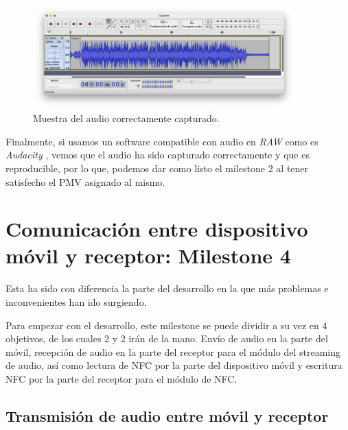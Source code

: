 \begin{figure}[h!]
    \centering
    \includegraphics[width=0.9\textwidth]{fotos/muestra_captura_audacity.png}
    \caption{Muestra del audio correctamente capturado.}
\end{figure}

Finalmente, si usamos un software compatible con audio en \emph{RAW} como es
\emph{Audacity} \cite{software-audacity}, vemos que el audio ha sido capturado
correctamente y que es reproducible, por lo que, podemos dar como listo el
milestone 2 al tener satisfecho el PMV asignado al mismo.

\section{Comunicación entre dispositivo móvil y receptor: Milestone 4}

Esta ha sido con diferencia la parte del desarrollo en la que más problemas e
inconvenientes han ido surgiendo.

Para empezar con el desarrollo, este milestone se puede dividir a su vez en 4
objetivos, de los cuales 2 y 2 irán de la mano. Envío de audio en la parte del
móvil, recepción de audio en la parte del receptor para el módulo del streaming
de audio, así como lectura de NFC por la parte del dispositivo móvil y escritura
NFC por la parte del receptor para el módulo de NFC.

\subsection{Transmisión de audio entre móvil y receptor}

